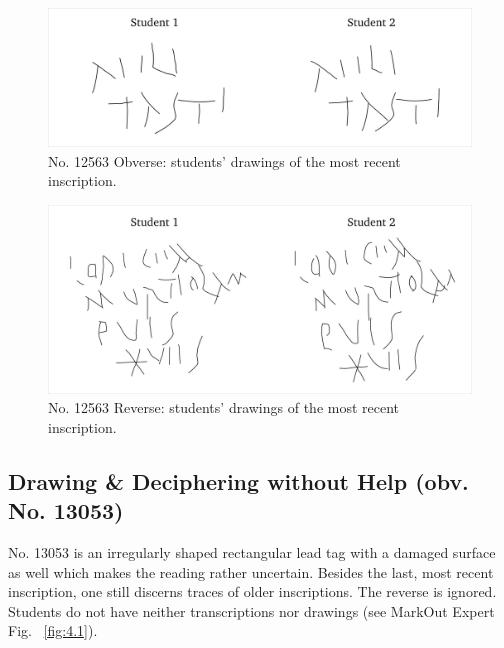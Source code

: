 \documentclass[amsthm,ebook]{saparticle}
\begin{document}
\begin{figure}[!hbp]
\centering
\includegraphics[scale=0.25]{EAGLE16lameetalteaching-img009.png}
\caption{No. 12563 Obverse: students' drawings of the most recent inscription.}
\label{fig:1}
\end{figure}

\begin{figure}[!hbp]
\centering
\includegraphics[scale=0.25]{EAGLE16lameetalteaching-img008.png}
\caption{No. 12563 Reverse: students' drawings of the most recent inscription.}
\label{fig:2}
\end{figure}



\subsection{Drawing \& Deciphering without Help (obv. No. 13053)}


No. 13053 is an irregularly shaped rectangular lead tag with a damaged surface as well which makes the reading rather
uncertain. Besides the last, most recent inscription, one still discerns traces of older inscriptions. The reverse is
ignored. Students do not have neither transcriptions nor drawings (see MarkOut Expert Fig. ~\ref{fig:4.1}).
\end{document}

